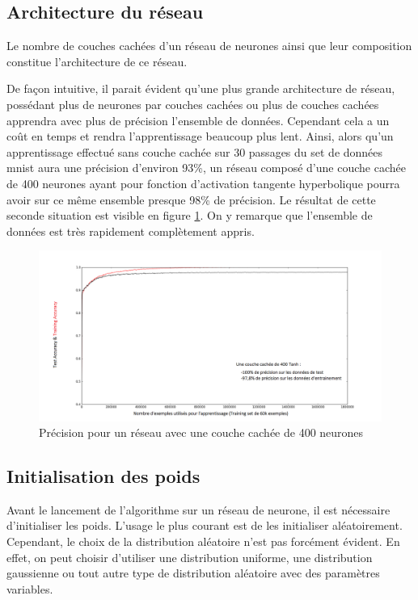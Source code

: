 \documentclass{report}
\theoremstyle{plain}
\theoremstyle{definition}
\theoremstyle{remark}
\begin{document}
\subsection{Architecture du réseau}

Le nombre de couches cachées d'un réseau de neurones ainsi que leur composition constitue l'architecture de ce réseau.

De façon intuitive, il parait évident qu'une plus grande architecture de réseau, possédant plus de neurones par couches cachées ou plus de couches cachées apprendra avec plus de précision l'ensemble de données. Cependant cela a un coût en temps et rendra l'apprentissage beaucoup plus lent.
Ainsi, alors qu'un apprentissage effectué sans couche cachée sur 30 passages du set de données mnist aura une précision d'environ 93\%, un réseau composé d'une couche cachée de 400 neurones ayant pour fonction d'activation tangente hyperbolique pourra avoir sur ce même ensemble presque 98\% de précision. Le résultat de cette seconde situation est visible en figure \ref{mnist100}. On y remarque que l'ensemble de données est très rapidement complètement appris.
\begin{figure}[!h]
\begin{center}
\includegraphics[scale=0.5]{images/mnist100.png}
\caption{Précision pour un réseau avec une couche cachée de 400 neurones}
\label{mnist100}
\end{center}
\end{figure}

\subsection{Initialisation des poids}
Avant le lancement de l'algorithme sur un réseau de neurone, il est nécessaire d'initialiser les poids. L'usage le plus courant est de les initialiser aléatoirement. Cependant, le choix de la distribution aléatoire n'est pas forcément évident. En effet, on peut choisir d'utiliser une distribution uniforme, une distribution gaussienne ou tout autre type de distribution aléatoire avec des paramètres variables.
\end{document}
